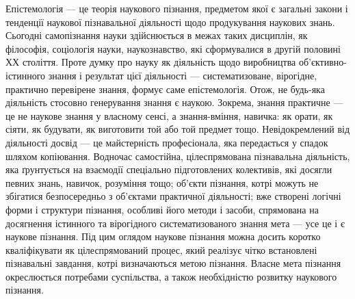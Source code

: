 Епістемологія --- це теорія наукового пізнання, предметом якої є загальні
закони і тенденції наукової пізнавальної діяльності щодо продукування
наукових знань. Сьогодні самопізнання науки здійснюється в межах таких
дисциплін, як філософія, соціологія науки, наукознавство, які сформувалися в
другій половині ХХ століття. Проте думку про науку як діяльність щодо
виробництва об’єктивно-істинного знання і результат цієї діяльності ---
систематизоване, вірогідне, практично перевірене знання, формує саме
епістемологія. Отож, не будь-яка діяльність стосовно генерування знання є
наукою. Зокрема, знання практичне --- це не наукове знання у власному сенсі, а
знання-вміння, навичка: як орати, як сіяти, як будувати, як виготовити той або
той предмет тощо. Невідокремлений від діяльності досвід --- це майстерність
професіонала, яка передається у спадок шляхом копіювання. Водночас
самостійна, цілеспрямована пізнавальна діяльність, яка ґрунтується на взаємодії
спеціально підготовлених колективів, які досягли певних знань, навичок,
розуміння тощо; об’єкти пізнання, котрі можуть не збігатися безпосередньо з
об’єктами практичної діяльності; вже створені логічні форми і структури
пізнання, особливі його методи і засоби, спрямована на досягнення істинного та
вірогідного систематизованого знання мета --- усе це і є наукове пізнання. Під
цим оглядом наукове пізнання можна досить коротко кваліфікувати як
цілеспрямований процес, який реалізує чітко встановлені пізнавальні завдання,
котрі визначаються метою пізнання. Власне мета пізнання окреслюється
потребами суспільства, а також необхідністю розвитку наукового пізнання.

